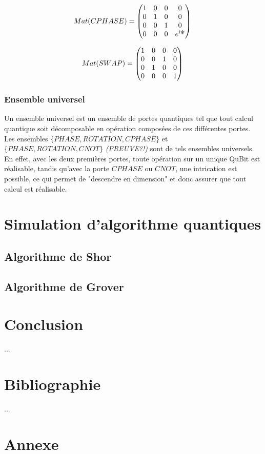 \documentclass[a4paper,12pt]{report}
\newcommand{\para}[1]{\par{#1}\\}
\begin{document}
\begin{equation}
	 Mat(CPHASE) = \left( \begin{matrix} 1 & 0 & 0 & 0 \\ 0 & 1 & 0 & 0 \\ 0 & 0 & 1 & 0 \\ 0 & 0 & 0 & e^{i\Phi} \\ \end{matrix} \right ) \\
\end{equation}

\vspace{1\baselineskip}

\begin{equation}
	 Mat(SWAP) = \left( \begin{matrix} 1 & 0 & 0 & 0 \\ 0 & 0 & 1 & 0 \\ 0 & 1 & 0 & 0 \\ 0 & 0 & 0 & 1 \\ \end{matrix} \right ) \\
\end{equation}

		\subsection{Ensemble universel}

\par{
	Un ensemble universel est un ensemble de portes quantiques tel que tout calcul quantique soit décomposable en opération composées de ces différentes portes. Les ensembles $\{PHASE,ROTATION,CPHASE\}$ et $\{PHASE,ROTATION,CNOT\}$ \emph{(PREUVE?!)} sont de tels ensembles universels. En effet, avec les deux premières portes, toute opération sur un unique QuBit est réalisable, tandis qu'avec la porte $CPHASE$ ou $CNOT$, une intrication est possible, ce qui permet de "descendre en dimension" et donc assurer que tout calcul est réalisable.
}

\chapter{Simulation d'algorithme quantiques}
	\section{Algorithme de Shor}
	\section{Algorithme de Grover}

%

\chapter*{Conclusion}

\para{
	...
}

\chapter*{Bibliographie}

\para{
	...
}


\chapter*{Annexe}
\end{document}
